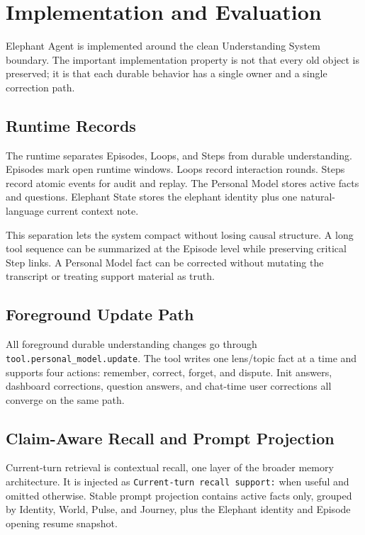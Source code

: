 \section{Implementation and Evaluation}
\label{sec:implementation-direction}

Elephant Agent is implemented around the clean Understanding System boundary. The
important implementation property is not that every old object is preserved; it
is that each durable behavior has a single owner and a single correction path.

\subsection{Runtime Records}

The runtime separates Episodes, Loops, and Steps from durable understanding.
Episodes mark open runtime windows. Loops record interaction rounds. Steps
record atomic events for audit and replay. The Personal Model stores active
facts and questions. Elephant State stores the elephant identity plus one natural-language
current context note.

This separation lets the system compact without losing causal structure. A long
tool sequence can be summarized at the Episode level while preserving critical
Step links. A Personal Model fact can be corrected without mutating the
transcript or treating support material as truth.

\subsection{Foreground Update Path}

All foreground durable understanding changes go through
\texttt{tool.personal\_model.update}. The tool writes one lens/topic fact at a
time and supports four actions: remember, correct, forget, and dispute. Init
answers, dashboard corrections, question answers, and chat-time user
corrections all converge on the same path.

\subsection{Claim-Aware Recall and Prompt Projection}

Current-turn retrieval is contextual recall, one layer of the broader memory
architecture. It is injected as \texttt{Current-turn recall support:} when useful
and omitted otherwise. Stable prompt projection contains active
facts only, grouped by Identity, World, Pulse, and Journey, plus the Elephant
identity and Episode opening resume snapshot.

